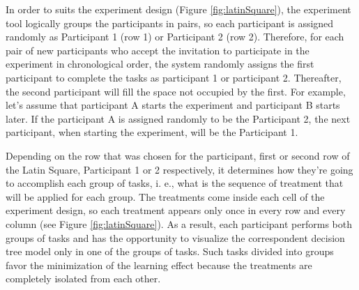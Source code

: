  In order to suits the experiment design (Figure \ref{fig:latinSquare}), the experiment tool logically groups the participants in pairs, so each participant is assigned randomly as Participant 1 (row 1) or Participant 2 (row 2). Therefore, for each pair of new participants who accept the invitation to participate in the experiment in chronological order, the system randomly assigns the first participant to complete the tasks as participant 1 or participant 2. Thereafter, the second participant will fill the space not occupied by the first. For example, let's assume that participant A starts the experiment and participant B starts later. If the participant A is assigned randomly to be the Participant 2, the next participant, when starting the experiment, will be the Participant 1.

Depending on the row that was chosen for the participant, first or second row of the Latin Square, Participant 1 or 2 respectively, it determines how they're going to accomplish each group of tasks, i. e., what is the sequence of treatment that will be applied for each group. The treatments come inside each cell of the experiment design, so each treatment appears only once in every row and every column (see Figure \ref{fig:latinSquare}). As a result, each participant performs both groups of tasks and has the opportunity to visualize the correspondent decision tree model only in one of the groups of tasks. Such tasks divided into groups favor the minimization of the learning effect because the treatments are completely isolated from each other.

